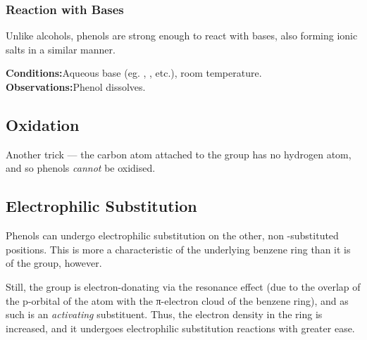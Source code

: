 

			\subsubsection{Reaction with Bases}

				Unlike alcohols, phenols are strong enough to react with bases, also forming ionic salts in a similar manner.


				\vspace{1.5em}
				\vbox{\textbf{Conditions:}\tabto{35mm}Aqueous base (eg. , , etc.), room temperature.}
				\vbox{\textbf{Observations:}\tabto{35mm}Phenol dissolves.}






		\subsection{Oxidation}

			Another trick --- the carbon atom attached to the  group has no hydrogen atom, and so phenols \textit{cannot} be
			oxidised.



		\subsection{Electrophilic Substitution}

			Phenols can undergo electrophilic substitution on the other, non -substituted positions. This is more a characteristic
			of the underlying benzene ring than it is of the  group, however.

			Still, the  group is electron-donating via the resonance effect (due to the overlap of the p-orbital of the  atom
			with the π-electron cloud of the benzene ring), and as such is an \textit{activating} substituent. Thus, the electron density
			in the ring is increased, and it undergoes electrophilic substitution reactions with greater ease.

